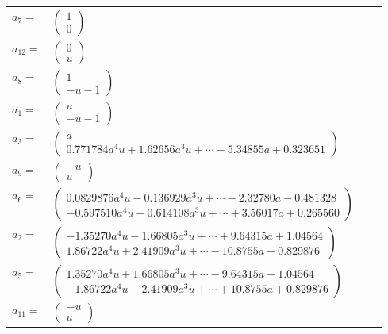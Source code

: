 \documentclass[1p]{elsarticle_modified}
\theoremstyle{definition}
\begin{document}
\begin{tabular}{m{7pt} m{180pt} m{7pt} m{180pt} }
\flushright $a_{7}=$&$\begin{pmatrix}1\\0\end{pmatrix}$ \\
\flushright $a_{12}=$&$\begin{pmatrix}0\\u\end{pmatrix}$ \\
\flushright $a_{8}=$&$\begin{pmatrix}1\\- u-1\end{pmatrix}$ \\
\flushright $a_{1}=$&$\begin{pmatrix}u\\- u-1\end{pmatrix}$ \\
\flushright $a_{3}=$&$\begin{pmatrix}a\\0.771784 a^{4} u+1.62656 a^{3} u+\cdots-5.34855 a+0.323651\end{pmatrix}$ \\
\flushright $a_{9}=$&$\begin{pmatrix}- u\\u\end{pmatrix}$ \\
\flushright $a_{6}=$&$\begin{pmatrix}0.0829876 a^{4} u-0.136929 a^{3} u+\cdots-2.32780 a-0.481328\\-0.597510 a^{4} u-0.614108 a^{3} u+\cdots+3.56017 a+0.265560\end{pmatrix}$ \\
\flushright $a_{2}=$&$\begin{pmatrix}-1.35270 a^{4} u-1.66805 a^{3} u+\cdots+9.64315 a+1.04564\\1.86722 a^{4} u+2.41909 a^{3} u+\cdots-10.8755 a-0.829876\end{pmatrix}$ \\
\flushright $a_{5}=$&$\begin{pmatrix}1.35270 a^{4} u+1.66805 a^{3} u+\cdots-9.64315 a-1.04564\\-1.86722 a^{4} u-2.41909 a^{3} u+\cdots+10.8755 a+0.829876\end{pmatrix}$ \\
\flushright $a_{11}=$&$\begin{pmatrix}- u\\u\end{pmatrix}$ \\

\end{tabular}
\end{document}
